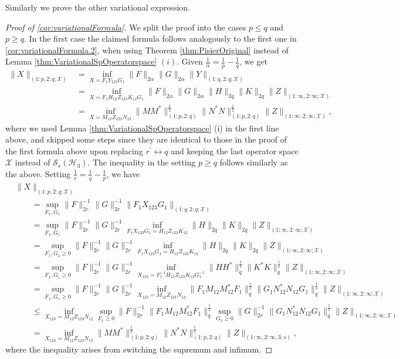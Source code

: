 \documentclass[11pt]{article}
\newcommand{\1}{\ensuremath{\mathbbm{1}}}
\theoremstyle{newdefinition}
\theoremstyle{newplain}
\theoremstyle{myplain}
\begin{document}
Similarly we prove the other variational expression.
\begin{proof}[Proof of \cref{cor:variationalFormula}]
We split the proof into the cases $p\leq q$ and $p\geq q$.
In the first case the claimed formula follows analogously to the first one in \cref{cor:variationalFormula.2}, when using Theorem \ref{thm:PisierOriginal} instead of Lemma \ref{thm:VariationalSpOperatorspace} $(i)$.
Given $\frac{1}{\alpha}=\frac{1}{p}-\frac{1}{q}$, we get
\begin{align}
\|X\|_{(1:p,2:q;\mathcal{X})} &{=} \inf_{ X=F_1Y_{123}G_1} \|F\|_{2\alpha}\|G\|_{2\alpha}\|Y\|_{(1:q,2:q;\mathcal{X})} \\ &= \inf_{X=F_1H_{12}Z_{123}K_{12}G_1} \|F\|_{2\alpha} \|G\|_{2\alpha} \|H\|_{2q} \|K\|_{2q} \|Z\|_{(1:\infty,2:\infty;\mathcal{X})} \\ &=  \inf_{ X=M_{12}Z_{123}N_{12}}\|MM^*\|^{\frac{1}{2}}_{(1:p,2:q)}\|N^*N\|^{\frac{1}{2}}_{(1:p,2:q)}\|Z\|_{(1:\infty,2:\infty;\mathcal{X})},
\end{align} 
where we used Lemma \ref{thm:VariationalSpOperatorspace} (i) in the first line above, and skipped some steps since they are identical to those in the proof of the first formula above upon replacing $r^\prime\leftrightarrow q$ and keeping the last operator space $\mathcal{X}$ instead of $\mathcal{S}_s(\mathcal{H}_3)$. The inequality in the setting $p\geq q$ follows similarly as the above. Setting $\frac{1}{r}=\frac{1}{q}-\frac{1}{p}$, we have
\begin{align}
&\|X\|_{(1:p,2:q;\mathcal{X})} \\
&\qquad = \sup_{F_1,G_1}\|F\|_{2r}^{-1}\|G\|_{2r}^{-1}\|F_1X_{123}G_1\|_{(1:q,2:q;\mathcal{X})} \\
&\qquad= \sup_{F_1,G_1}\|F\|_{2r}^{-1}\|G\|_{2r}^{-1} \inf_{F_1X_{123}G_1=H_{12}Z_{123}K_{12}}\|H\|_{2q}\|K\|_{2q}\|Z\|_{(1:\infty,2:\infty;\mathcal{X})} \\
&\qquad = \sup_{F_1,G_1\ge 0}\|F\|_{2r}^{-1}\|G\|_{2r}^{-1} \inf_{ F_1X_{123}G_1=H_{12}Z_{123}K_{12}}\|H\|_{2q}\|K\|_{2q}\|Z\|_{(1:\infty,2:\infty;\mathcal{X})} \\
&\qquad = \sup_{F_1,G_1\ge  0}\|F\|_{2r}^{-1}\|G\|_{2r}^{-1} \inf_{ X_{123}=F^{-1}_1H_{12}Z_{123}K_{12}G_1^{-1}}\|HH^*\|^{\frac{1}{2}}_{q}\|K^*K\|^{\frac{1}{2}}_{q}\|Z\|_{(1:\infty,2:\infty;\mathcal{X})}
    \\
    &\qquad = \sup_{F_1,G_1\ge 0}\|F\|_{2r}^{-1}\|G\|_{2r}^{-1} \inf_{ X_{123}=M_{12}Z_{123}N_{12}}\!\!\!\!\|F_1M_{12}M^*_{12}F_1\|^{\frac{1}{2}}_{q}\|G_1N^*_{12}N_{12}G_1\|^{\frac{1}{2}}_{q}\|Z\|_{(1:\infty,2:\infty;\mathcal{X})}
    \\ &\qquad \leq \inf_{X_{123}=M_{12}Z_{123}N_{12}}\sup_{F_1\ge 0}\|F\|_{2r}^{-1}\|F_1M_{12}M^*_{12}F_1\|^{\frac{1}{2}}_{q}\!\sup_{G_1\ge  0}\|G\|_{2r}^{-1}\|G_1N^*_{12}N_{12}G_1\|^{\frac{1}{2}}_{q}\!\|Z\|_{(1:\infty,2:\infty;\mathcal{X})}
    \\&\qquad = \inf_{ X_{123}=M_{12}Z_{123}N_{12}}\|MM^*\|^{\frac{1}{2}}_{(1:p,2:q)}\|N^*N\|^{\frac{1}{2}}_{(1:p,2:q)}\|Z\|_{(1:\infty,2:\infty,3:s)},
\end{align} 
where the inequality arises from switching the supremum and infimum. 
\end{proof}
\end{document}
